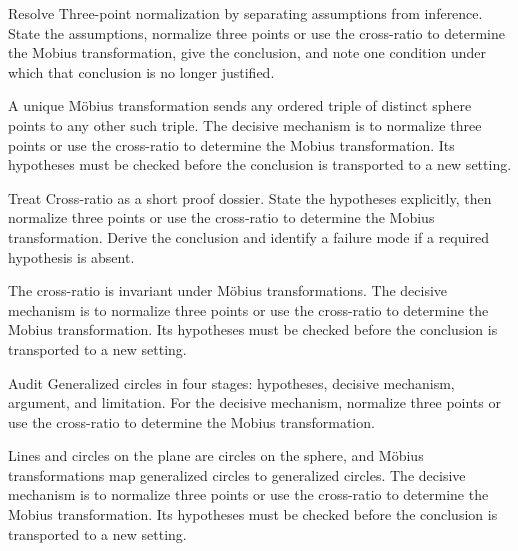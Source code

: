 \begin{problem}\label{prob:iv16-problem-04}
Resolve Three-point normalization by separating assumptions from inference. State the assumptions, normalize three points or use the cross-ratio to determine the Mobius transformation, give the conclusion, and note one condition under which that conclusion is no longer justified.
\end{problem}
\begin{solution}
A unique Möbius transformation sends any ordered triple of distinct sphere points to any other such triple. The decisive mechanism is to normalize three points or use the cross-ratio to determine the Mobius transformation. Its hypotheses must be checked before the conclusion is transported to a new setting.
\end{solution}

\begin{problem}\label{prob:iv16-problem-05}
Treat Cross-ratio as a short proof dossier. State the hypotheses explicitly, then normalize three points or use the cross-ratio to determine the Mobius transformation. Derive the conclusion and identify a failure mode if a required hypothesis is absent.
\end{problem}
\begin{solution}
The cross-ratio is invariant under Möbius transformations. The decisive mechanism is to normalize three points or use the cross-ratio to determine the Mobius transformation. Its hypotheses must be checked before the conclusion is transported to a new setting.
\end{solution}

\begin{problem}\label{prob:iv16-problem-06}
Audit Generalized circles in four stages: hypotheses, decisive mechanism, argument, and limitation. For the decisive mechanism, normalize three points or use the cross-ratio to determine the Mobius transformation.
\end{problem}
\begin{solution}
Lines and circles on the plane are circles on the sphere, and Möbius transformations map generalized circles to generalized circles. The decisive mechanism is to normalize three points or use the cross-ratio to determine the Mobius transformation. Its hypotheses must be checked before the conclusion is transported to a new setting.
\end{solution}

